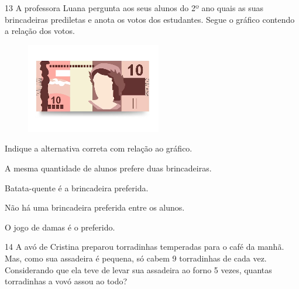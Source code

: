 \num{13} A professora Luana pergunta aos seus alunos do 2º ano quais as suas
brincadeiras prediletas e anota os votos dos estudantes. Segue o gráfico
contendo a relação dos votos.

\begin{figure}[htpb!]
\includegraphics[width=\textwidth]{./media/image158.png}
\end{figure}

Indique a alternativa correta com relação ao gráfico.

\begin{escolha}
\item A mesma quantidade de alunos prefere duas brincadeiras.

\item Batata-quente é a brincadeira preferida.

\item Não há uma brincadeira preferida entre os alunos.

\item O jogo de damas é o preferido.
\end{escolha}


\num{14} A avó de Cristina preparou torradinhas temperadas para o café da manhã.
Mas, como sua assadeira é pequena, só cabem 9 torradinhas de cada vez.
Considerando que ela teve de levar sua assadeira ao forno 5 vezes,
quantas torradinhas a vovó assou ao todo?

